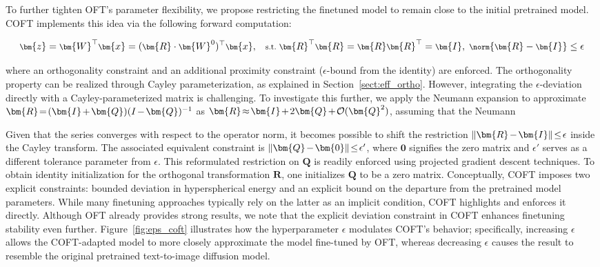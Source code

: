 To further tighten OFT’s parameter flexibility, we propose restricting the finetuned model to remain close to the initial pretrained model. COFT implements this idea via the following forward computation:

\begin{equation}\label{eq:coft_general}
    \footnotesize
    \bm{z}=\bm{W}^\top\bm{x}=(\bm{R}\cdot\bm{W}^0)^\top\bm{x},~~~\text{s.t.}~\bm{R}^\top\bm{R}=\bm{R}\bm{R}^\top=\bm{I},~\norm{\bm{R}-\bm{I}}\leq \epsilon
\end{equation}

where an orthogonality constraint and an additional proximity constraint ($\epsilon$-bound from the identity) are enforced. The orthogonality property can be realized through Cayley parameterization, as explained in Section~\ref{sect:eff_ortho}. However, integrating the $\epsilon$-deviation directly with a Cayley-parameterized matrix is challenging. To investigate this further, we apply the Neumann expansion to approximate $\thickmuskip=2mu \medmuskip=2mu \bm{R}=(\bm{I}+\bm{Q})(I-\bm{Q})^{-1}$ as $\thickmuskip=2mu \medmuskip=2mu \bm{R}\approx\bm{I}+2\bm{Q}+\mathcal{O}(\bm{Q}^2)$, assuming that the Neumann

Given that the series converges with respect to the operator norm, it becomes possible to shift the restriction $\thickmuskip=2mu \medmuskip=2mu\|\bm{R}-\bm{I}\|\leq\epsilon$ inside the Cayley transform. The associated equivalent constraint is $\thickmuskip=2mu \medmuskip=2mu \|\bm{Q}-\bm{0}\|\leq\epsilon'$, where $\bm{0}$ signifies the zero matrix and $\epsilon'$ serves as a different tolerance parameter from $\epsilon$. This reformulated restriction on $\bm{Q}$ is readily enforced using projected gradient descent techniques. To obtain identity initialization for the orthogonal transformation $\bm{R}$, one initializes $\bm{Q}$ to be a zero matrix. Conceptually, COFT imposes two explicit constraints: bounded deviation in hyperspherical energy and an explicit bound on the departure from the pretrained model parameters. While many finetuning approaches typically rely on the latter as an implicit condition, COFT highlights and enforces it directly. Although OFT already provides strong results, we note that the explicit deviation constraint in COFT enhances finetuning stability even further. Figure~\ref{fig:eps_coft} illustrates how the hyperparameter $\epsilon$ modulates COFT’s behavior; specifically, increasing $\epsilon$ allows the COFT-adapted model to more closely approximate the model fine-tuned by OFT, whereas decreasing $\epsilon$ causes the result to resemble the original pretrained text-to-image diffusion model.

